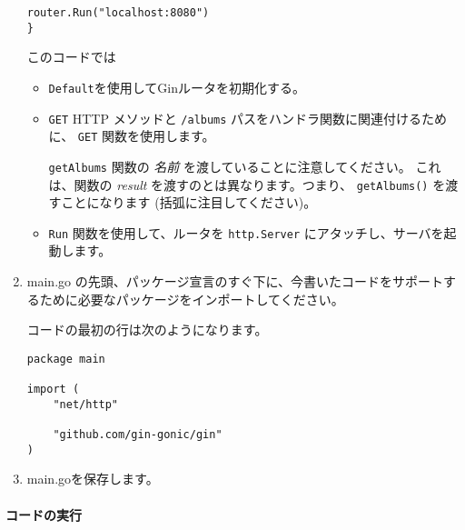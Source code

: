 \begin{enumerate}
\begin{lstlisting}[numbers=none]
    router.Run("localhost:8080")
}
\end{lstlisting}

  このコードでは

  \begin{itemize}
  \item
    \texttt{Default}を使用してGinルータを初期化する。
  \item
    \texttt{GET} HTTP メソッドと \texttt{/albums}
    パスをハンドラ関数に関連付けるために、 \texttt{GET}
    関数を使用します。

    \texttt{getAlbums} 関数の \emph{名前}
    を渡していることに注意してください。 これは、関数の \emph{result}
    を渡すのとは異なります。つまり、 \texttt{getAlbums()}
    を渡すことになります (括弧に注目してください)。
  \item
    \texttt{Run} 関数を使用して、ルータを \texttt{http.Server}
    にアタッチし、サーバを起動します。
  \end{itemize}
\item
  main.go
  の先頭、パッケージ宣言のすぐ下に、今書いたコードをサポートするために必要なパッケージをインポートしてください。

  コードの最初の行は次のようになります。

\begin{lstlisting}[numbers=none]
package main

import (
    "net/http"

    "github.com/gin-gonic/gin"
)
\end{lstlisting}
\item
  main.goを保存します。
\end{enumerate}

\paragraph{コードの実行}

